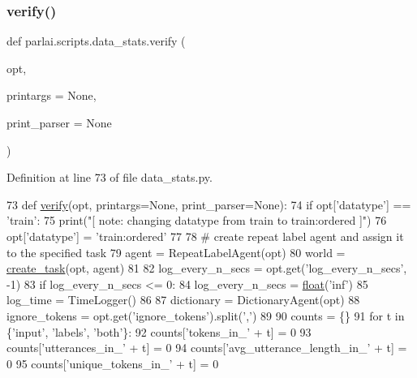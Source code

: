 \subsubsection{\texorpdfstring{verify()}{verify()}}
{\footnotesize\ttfamily def parlai.\+scripts.\+data\+\_\+stats.\+verify (\begin{DoxyParamCaption}\item[{}]{opt,  }\item[{}]{printargs = {\ttfamily None},  }\item[{}]{print\+\_\+parser = {\ttfamily None} }\end{DoxyParamCaption})}



Definition at line 73 of file data\+\_\+stats.\+py.


\begin{DoxyCode}
73 \textcolor{keyword}{def }\hyperlink{namespaceparlai_1_1scripts_1_1data__stats_a3bf0a490abe0b6ea608d1f9ece194c79}{verify}(opt, printargs=None, print\_parser=None):
74     \textcolor{keywordflow}{if} opt[\textcolor{stringliteral}{'datatype'}] == \textcolor{stringliteral}{'train'}:
75         print(\textcolor{stringliteral}{"[ note: changing datatype from train to train:ordered ]"})
76         opt[\textcolor{stringliteral}{'datatype'}] = \textcolor{stringliteral}{'train:ordered'}
77 
78     \textcolor{comment}{# create repeat label agent and assign it to the specified task}
79     agent = RepeatLabelAgent(opt)
80     world = \hyperlink{namespaceparlai_1_1core_1_1worlds_a11923c10b545c7ecc1b08fe2242d9c2c}{create\_task}(opt, agent)
81 
82     log\_every\_n\_secs = opt.get(\textcolor{stringliteral}{'log\_every\_n\_secs'}, -1)
83     \textcolor{keywordflow}{if} log\_every\_n\_secs <= 0:
84         log\_every\_n\_secs = \hyperlink{namespaceprojects_1_1controllable__dialogue_1_1make__control__dataset_aa2b7207688c641dbc094ab44eca27113}{float}(\textcolor{stringliteral}{'inf'})
85     log\_time = TimeLogger()
86 
87     dictionary = DictionaryAgent(opt)
88     ignore\_tokens = opt.get(\textcolor{stringliteral}{'ignore\_tokens'}).split(\textcolor{stringliteral}{','})
89 
90     counts = \{\}
91     \textcolor{keywordflow}{for} t \textcolor{keywordflow}{in} \{\textcolor{stringliteral}{'input'}, \textcolor{stringliteral}{'labels'}, \textcolor{stringliteral}{'both'}\}:
92         counts[\textcolor{stringliteral}{'tokens\_in\_'} + t] = 0
93         counts[\textcolor{stringliteral}{'utterances\_in\_'} + t] = 0
94         counts[\textcolor{stringliteral}{'avg\_utterance\_length\_in\_'} + t] = 0
95         counts[\textcolor{stringliteral}{'unique\_tokens\_in\_'} + t] = 0

\end{DoxyCode}
